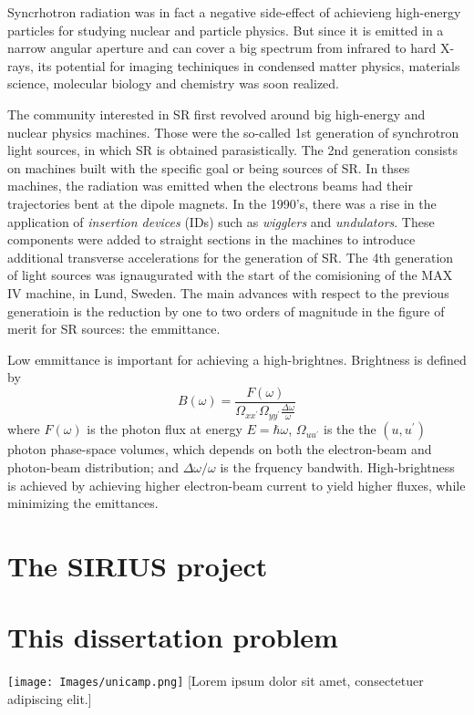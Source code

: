 Syncrhotron radiation was in fact a negative side-effect of achievieng high-energy particles for studying nuclear and particle physics. But since it is emitted in a narrow angular aperture and can cover a big spectrum from infrared to hard X-rays, its potential for imaging techiniques in condensed matter physics, materials science, molecular biology and chemistry was soon realized.

The community interested in SR first revolved around big high-energy and nuclear physics machines. Those were the so-called 1st generation of synchrotron light sources, in which SR is obtained parasistically. The 2nd generation consists on machines built with the specific goal or being sources of SR. In thses machines, the radiation was emitted when the electrons beams had their trajectories bent at the dipole magnets. In the 1990's, there was a rise in the application of \textit{insertion devices} (IDs) such as \textit{wigglers} and \textit{undulators}. These components were added to straight sections in the machines to introduce additional transverse accelerations for the generation of SR. The 4th generation of light sources was ignaugurated with the start of the comisioning of the MAX IV machine, in Lund, Sweden. The main advances with respect to the previous generatioin is the reduction by one to two orders of magnitude in the figure of merit for SR sources: the emmittance.

Low emmittance is important for achieving a high-brightnes. Brightness is defined by
\begin{equation}
    B(\omega) = \frac{F(\omega)}{\Omega_{xx^\prime}\Omega_{yy^\prime}\frac{\Delta \omega}{\omega}}
\end{equation}
where $F(\omega)$ is the photon flux at energy $E=\hbar\omega$, $\Omega_{uu^\prime}$ is the the $(u,u^\prime)$ photon phase-space volumes, which depends on both the electron-beam and photon-beam distribution; and $\Delta\omega/\omega$ is the frquency bandwith. High-brightness is achieved by achieving higher electron-beam current to yield higher fluxes, while minimizing the emittances.

\section{The SIRIUS project}
\lipsum[1-3]

\section{This dissertation problem}
\lipsum[1-3]

\begin{center}
\texttt{[image: Images/unicamp.png]}
[Lorem ipsum dolor sit amet, consectetuer adipiscing elit.]{\lipsum[1]}
\end{center}

\lipsum[1-3]

\begin{longcitation}
\lipsum[1]
\end{longcitation}

\lipsum[4-10]

